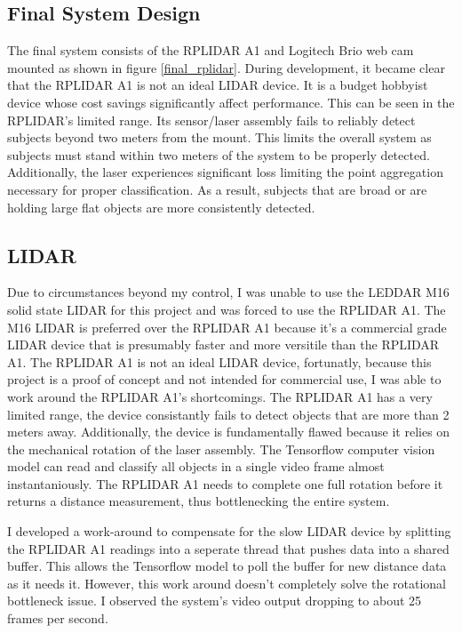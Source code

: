 \documentclass[onecolumn, draftclsnofoot,10pt, compsoc]{IEEEtran}
\begin{document}
\begin{singlespace}
	\section{Final System Design}
		The final system consists of the RPLIDAR A1 and Logitech Brio web cam mounted as shown in figure \ref{final_rplidar}.
		During development, it became clear that the RPLIDAR A1 is not an ideal LIDAR device.
		It is a budget hobbyist device whose cost savings significantly affect performance.
		This can be seen in the RPLIDAR's limited range.
		Its sensor/laser assembly fails to reliably detect subjects beyond two meters from the mount. 
		This limits the overall system as subjects must stand within two meters of the system to be properly detected.
		Additionally, the laser experiences significant loss limiting the point aggregation necessary for proper classification.
		As a result, subjects that are broad or are holding large flat objects are more consistently detected.
		
		\subsection{LIDAR}
		Due to circumstances beyond my control, I was unable to use the LEDDAR M16 solid state LIDAR for this project and was forced to use the RPLIDAR A1. 
		The M16 LIDAR is preferred over the RPLIDAR A1 because it's a commercial grade LIDAR device that is presumably faster and more versitile than the RPLIDAR A1.
		The RPLIDAR A1 is not an ideal LIDAR device, fortunatly, because this project is a proof of concept and not intended for commercial use, I was able to work around the RPLIDAR A1's shortcomings.
		The RPLIDAR A1 has a very limited range, the device consistantly fails to detect objects that are more than 2 meters away.
		Additionally, the device is fundamentally flawed because it relies on the mechanical rotation of the laser assembly. 
		The Tensorflow computer vision model can read and classify all objects in a single video frame almost instantaniously. 
		The RPLIDAR A1 needs to complete one full rotation before it returns a distance measurement, thus bottlenecking the entire system.


		I developed a work-around to compensate for the slow LIDAR device by splitting the RPLIDAR A1 readings into a seperate thread that pushes data into a shared buffer.
		This allows the Tensorflow model to poll the buffer for new distance data as it needs it.
		However, this work around doesn't completely solve the rotational bottleneck issue. 
		I observed the system's video output dropping to about 25 frames per second.



\end{singlespace}
\end{document}

